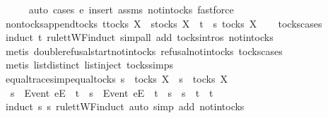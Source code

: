\ \ \ \ \isamarkupfalse%
\ {\isacharparenleft}auto{\isacharcomma}\ cases\ e{\isacharcomma}\ insert\ assms\ notin{\isacharunderscore}tocks{\isacharcomma}\ fastforce{\isacharplus}{\isacharparenright}\isanewline
{}\isamarkupfalse%
%
\endisatagproof
{\isafoldproof}%
%
\isadelimproof
\isanewline
%
\endisadelimproof
\isanewline
{}\isamarkupfalse%
\ nontocks{\isacharunderscore}append{\isacharunderscore}tocks{\isacharcolon}\ {\isachardoublequoteopen}t{\isasymnotin}tocks\ X\ {\isasymLongrightarrow}\ s{\isasymin}tocks\ X\ {\isasymLongrightarrow}\ t\ {\isacharat}\ s\ {\isasymnotin}tocks\ X{\isachardoublequoteclose}\isanewline
%
\isadelimproof
\ \ %
\endisadelimproof
%
\isatagproof
{}\isamarkupfalse%
\ tocks{\isachardot}cases\ \isamarkupfalse%
\ {\isacharparenleft}induct\ t\ rule{\isacharcolon}ttWF{\isachardot}induct{\isacharcomma}\ simp{\isacharunderscore}all\ add{\isacharcolon}\ tocks{\isachardot}intros\ notin{\isacharunderscore}tocks{\isacharparenright}\isanewline
\ \ \isamarkupfalse%
\ {\isacharparenleft}metis\ double{\isacharunderscore}refusal{\isacharunderscore}start{\isacharunderscore}notin{\isacharunderscore}tocks\ refusal{\isacharunderscore}notin{\isacharunderscore}tocks\ tocks{\isachardot}cases{\isacharparenright}\isanewline
\ \ \isamarkupfalse%
\ {\isacharparenleft}metis\ list{\isachardot}distinct{\isacharparenleft}{}{\isacharparenright}\ list{\isachardot}inject\ tocks{\isachardot}simps{\isacharparenright}%
\endisatagproof
{\isafoldproof}%
%
\isadelimproof
\isanewline
%
\endisadelimproof
\isanewline
{}\isamarkupfalse%
\ equal{\isacharunderscore}traces{\isacharunderscore}imp{\isacharunderscore}equal{\isacharunderscore}tocks{\isacharcolon}\ {\isachardoublequoteopen}s\ {\isasymin}\ tocks\ X\ {\isasymLongrightarrow}\ s{\isacharprime}\ {\isasymin}\ tocks\ X\ \ {\isasymLongrightarrow}\ \isanewline
\ \ s\ {\isacharat}\ {\isacharbrackleft}{\isacharbrackleft}Event\ e{\isacharbrackright}\isactrlsub E{\isacharbrackright}\ {\isacharat}\ t\ {\isacharequal}\ s{\isacharprime}\ {\isacharat}\ {\isacharbrackleft}{\isacharbrackleft}Event\ e{\isacharbrackright}\isactrlsub E{\isacharbrackright}\ {\isacharat}\ t{\isacharprime}\ {\isasymLongrightarrow}\ s\ {\isacharequal}\ s{\isacharprime}\ {\isasymand}\ t\ {\isacharequal}\ t{\isacharprime}{\isachardoublequoteclose}\isanewline
%
\isadelimproof
\ \ %
\endisadelimproof
%
\isatagproof
{}\isamarkupfalse%
\ {\isacharparenleft}induct\ s\ s{\isacharprime}\ rule{\isacharcolon}ttWF{}{\isachardot}induct{\isacharcomma}\ auto\ simp\ add{\isacharcolon}\ notin{\isacharunderscore}tocks{\isacharparenright}\isanewline
